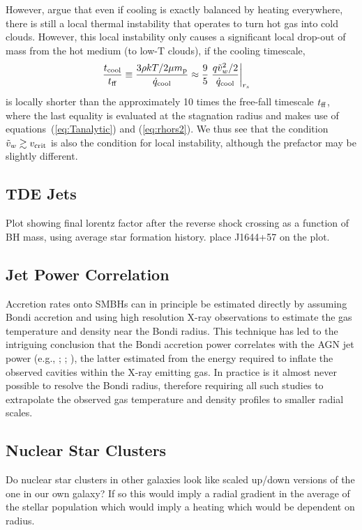 \documentclass[usenatbib,fleqn]{mn2e}
\newcommand{\rs}{r_s}
\newcommand{\vw}{\tilde{v}_{w}}
\renewcommand{\mp}{m_{\rm p}}
\newcommand{\tcool}{t_{\rm cool}}
\newcommand{\tff}{t_{\rm ff}}
\begin{document}
However, \citet{McCourt+12} argue that even if cooling is exactly
balanced by heating everywhere, there is still a local thermal
instability that operates to turn hot gas into cold clouds.  However,
this local instability only causes a significant local drop-out of
mass from the hot medium (to low-T clouds), if the cooling timescale,
\begin{align}
\frac{\tcool}{\tff} &\equiv \frac{3\rho k T/2 \mu \mp}{\dot{q}_{\rm cool}} \approx \frac{9}{5} \left. \frac{q \vw^2/2}{\dot{q}_{\rm cool}}\right|_{\rs}
\end{align} 
is locally shorter than the approximately 10 times the free-fall
timescale $t_{\rm ff}$, where the last equality is evaluated at the
stagnation radius and makes use of equations~(\ref{eq:Tanalytic}) and
(\ref{eq:rhors2}).  We thus see that the condition $\tilde{v}_{w} \gtrsim v_{\rm
  crit}$ is also the condition for local instability, although the
prefactor may be slightly different.

\subsection{TDE Jets}

Plot showing final lorentz factor after the reverse shock crossing as a function of BH mass, using average star formation history.  place J1644+57 on the plot.

\subsection{Jet Power Correlation}

Accretion rates onto SMBHs can in principle be estimated directly by
assuming Bondi accretion and using high resolution X-ray observations
to estimate the gas temperature and density near the Bondi radius.
This technique has led to the intriguing conclusion that the Bondi
accretion power correlates with the AGN jet power (e.g.,
\citealt{AllenDunn+:2006a}; \citealt{Russell+13};
\citealt{FujitaKawakatu+:2014a}), the latter estimated from the energy
required to inflate the observed cavities within the X-ray emitting
gas.  In practice is it almost never possible to resolve the Bondi
radius, therefore requiring all such studies to extrapolate the
observed gas temperature and density profiles to smaller radial
scales.

\subsection{Nuclear Star Clusters}
Do nuclear star clusters in other galaxies look like scaled up/down
versions of the one in our own galaxy? If so this would imply a radial
gradient in the average of the stellar population which would imply a
heating which would be dependent on radius.
\end{document}
